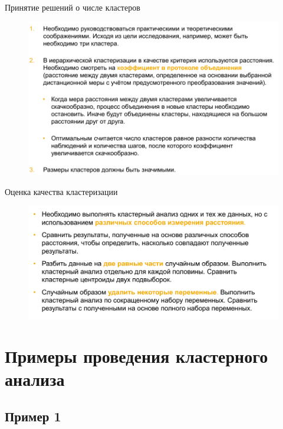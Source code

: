 \documentclass{beamer}
\begin{document}
\begin{frame}{Принятие решений о числе кластеров}
\begin{figure}[h]
\centering
\includegraphics[scale=0.5]{images/lec07-pic26.png}
\end{figure}
\end{frame}

\begin{frame}{Оценка качества кластеризации}
\begin{figure}[h]
\centering
\includegraphics[scale=0.5]{images/lec07-pic27.png}
\end{figure}
\end{frame}

\section{Примеры проведения кластерного анализа}

\subsection{Пример 1}
\end{document}
